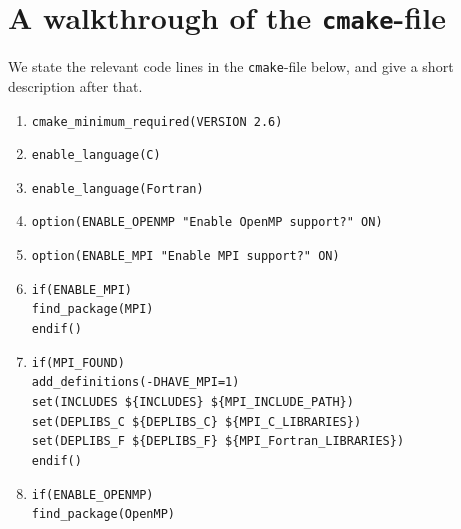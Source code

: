 \documentclass{article}
\begin{document}
\section{A walkthrough of the \texttt{cmake}-file}

We state the relevant code lines in the \texttt{cmake}-file below, and give a short description after that.

\begin{enumerate}
    \item \label{enum:minreq} \texttt{cmake\_minimum\_required(VERSION 2.6)}
    \item \label{enum:lang} \texttt{enable\_language(C)}
    \item \label{enum:langF} \texttt{enable\_language(Fortran)}
    \item \label{enum:openmp} \texttt{option(ENABLE\_OPENMP "Enable OpenMP support?" ON)}
    \item \label{enum:mpi} \texttt{option(ENABLE\_MPI    "Enable MPI support?" ON)}
    \item \label{enum:mpiallow} \texttt{if(ENABLE\_MPI)}\\
         \text{ \hspace{1pt} } \texttt{find\_package(MPI)}\\
        \texttt{endif()}
    \item \label{enum:mpiallow2} \texttt{if(MPI\_FOUND)} \\
                                        \text{ \hspace{1pt} } \texttt{add\_definitions(-DHAVE\_MPI=1)} \\
                                        \text{ \hspace{1pt} } \texttt{set(INCLUDES \$\{INCLUDES\} \$\{MPI\_INCLUDE\_PATH\})} \\
                                        \text{ \hspace{1pt} } \texttt{set(DEPLIBS\_C \$\{DEPLIBS\_C\} \$\{MPI\_C\_LIBRARIES\})} \\
                                        \text{ \hspace{1pt} } \texttt{set(DEPLIBS\_F \$\{DEPLIBS\_F\} \$\{MPI\_Fortran\_LIBRARIES\})} \\
                                    \texttt{endif()}
    \item \label{enum:openmpallow}  \texttt{if(ENABLE\_OPENMP)} \\
                                        \text{ \hspace{1pt} } \texttt{find\_package(OpenMP)} \\

\end{enumerate}
\end{document}
